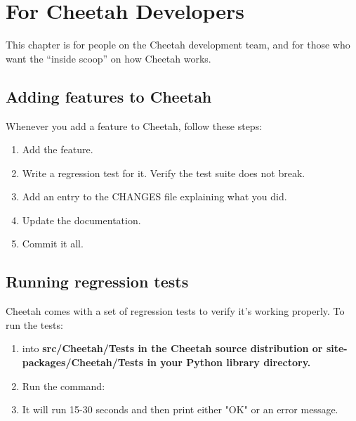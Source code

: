 \section{For Cheetah Developers}
\label{developer}

This chapter is for people on the Cheetah development team, and for those who
want the ``inside scoop'' on how Cheetah works.

\subsection{Adding features to Cheetah}

Whenever you add a feature to Cheetah, follow these steps:

\begin{enumerate}

\item  Add the feature.

\item  Write a regression test for it.  Verify the test suite does not break.

\item  Add an entry to the CHANGES file explaining what you did.

\item  Update the documentation.

\item  Commit it all.

\end{enumerate}


\subsection{Running regression tests}

Cheetah comes with a set of regression tests to verify it's working properly.
To run the tests:

\begin{enumerate}

\item  {} into \bf{src/Cheetah/Tests} in the Cheetah source distribution 
     or \bf{site-packages/Cheetah/Tests} in your Python library directory.
     
\item  Run the command:  

\item  It will run 15-30 seconds and then print either "OK" or an error message.

\end{enumerate}

